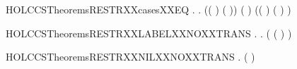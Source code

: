 \newcommand{\HOLCCSTheoremsRESTRXXcases}{\UseVerbatim{HOLCCSTheoremsRESTRXXcases}}
\begin{SaveVerbatim}{HOLCCSTheoremsRESTRXXcasesXXEQ}
\HOLTokenTurnstile{} \HOLSymConst{\HOLTokenForall{}}   .
       \HOLConst{\ensuremath{\nu}}   \HOLTokenTransBegin{}\HOLTokenTransEnd {} \HOLSymConst{\HOLTokenEquiv{}}
       \HOLSymConst{\HOLTokenExists{}}   .
           (( \HOLSymConst{=} ) \HOLSymConst{\HOLTokenConj{}} ( \HOLSymConst{=} )) \HOLSymConst{\HOLTokenConj{}} ( \HOLSymConst{=} \HOLConst{\ensuremath{\nu}}  ) \HOLSymConst{\HOLTokenConj{}}  \HOLTokenTransBegin{}\HOLTokenTransEnd {} \HOLSymConst{\HOLTokenConj{}}
           (( \HOLSymConst{=} \HOLConst{\ensuremath{\tau}}) \HOLSymConst{\HOLTokenDisj{}} ( \HOLSymConst{=}  ) \HOLSymConst{\HOLTokenConj{}}  \HOLConst{\HOLTokenNotIn{}}  \HOLSymConst{\HOLTokenConj{}}   \HOLConst{\HOLTokenNotIn{}} )
\end{SaveVerbatim}
\newcommand{\HOLCCSTheoremsRESTRXXcasesXXEQ}{\UseVerbatim{HOLCCSTheoremsRESTRXXcasesXXEQ}}
\begin{SaveVerbatim}{HOLCCSTheoremsRESTRXXLABELXXNOXXTRANS}
\HOLTokenTurnstile{} \HOLSymConst{\HOLTokenForall{}} .
        \HOLConst{\HOLTokenIn{}}  \HOLSymConst{\HOLTokenDisj{}}   \HOLConst{\HOLTokenIn{}}  \HOLSymConst{\HOLTokenImp{}} \HOLSymConst{\HOLTokenForall{}}  . \HOLSymConst{\HOLTokenNeg{}}(\HOLConst{\ensuremath{\nu}}  ( ) \HOLTokenTransBegin{}\HOLTokenTransEnd {})
\end{SaveVerbatim}
\newcommand{\HOLCCSTheoremsRESTRXXLABELXXNOXXTRANS}{\UseVerbatim{HOLCCSTheoremsRESTRXXLABELXXNOXXTRANS}}
\begin{SaveVerbatim}{HOLCCSTheoremsRESTRXXNILXXNOXXTRANS}
\HOLTokenTurnstile{} \HOLSymConst{\HOLTokenForall{}}  . \HOLSymConst{\HOLTokenNeg{}}(\HOLConst{\ensuremath{\nu}}   \HOLTokenTransBegin{}\HOLTokenTransEnd {})
\end{SaveVerbatim}

